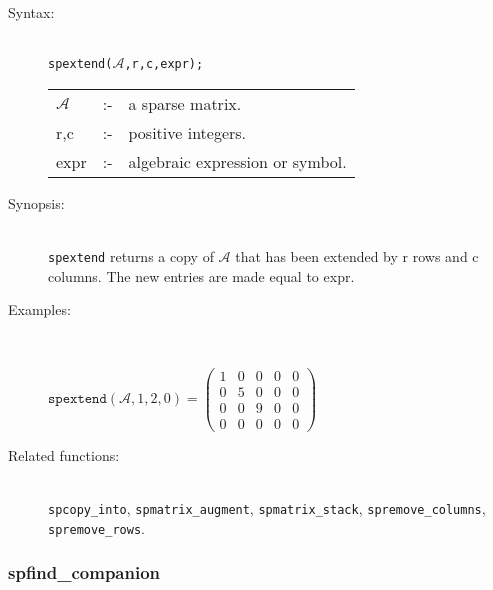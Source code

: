 \begin{description}
\item[Syntax:]\mbox{}\\
 \texttt{spextend($\mathcal{A}$,r,c,expr);}\\[2mm]
\begin{tabular}{l l l}
$\mathcal{A}$ &:-& a sparse matrix. \\
r,c        &:-& positive integers. \\
expr      &:-& algebraic expression or symbol.
\end{tabular}

\item[Synopsis:]\mbox{}\\
                \texttt{spextend} returns a copy of $\mathcal{A}$ that has been 
                extended by r rows and c columns. The new entries are
                made equal to expr.

\item[Examples:]\mbox{}\\
\begin{flushleft}  
\begin{math}  
\texttt{spextend}(\mathcal{A},1,2,0) =
\begin{pmatrix} 1 & 0 & 0 & 0 & 0 \\ 0 & 5 & 0 & 0 & 0
\\ 0 & 0 & 9 & 0 & 0 \\ 0 & 0 & 0 & 0 & 0 
\end{pmatrix}
\end{math}  
\end{flushleft}

\item[Related functions:]\mbox{}\\
\texttt{spcopy\_into}, \texttt{spmatrix\_augment}, 
\texttt{spmatrix\_stack}, \texttt{spremove\_columns}, \texttt{spremove\_rows}.

\end{description}


\subsubsection{spfind\_companion}
\label{sparse:spfind_companion}

